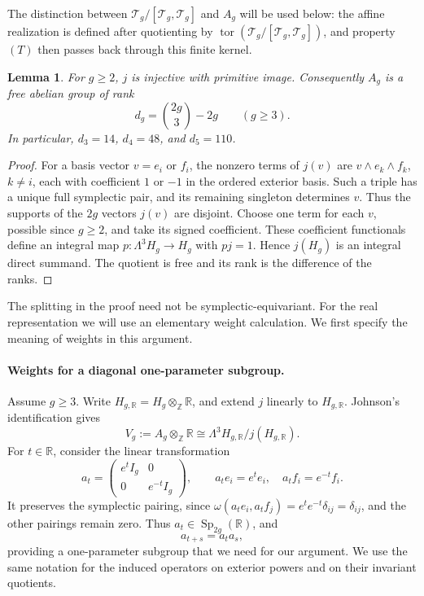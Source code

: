\documentclass[11pt,a4paper]{article}
\newtheorem{lemma}[theorem]{Lemma}
\theoremstyle{definition}
\newcommand{\R}{\mathbb R}
\newcommand{\Z}{\mathbb Z}
\newcommand{\Sp}{\operatorname{Sp}}
\newcommand{\tor}{\operatorname{tor}}
\newcommand{\rt}{(T)}
\begin{document}
The distinction between \(\mathcal{T}_g/[\mathcal{T}_g,\mathcal{T}_g]\) and \(A_g\) will be used below:
the affine realization is defined after quotienting by \(\tor(\mathcal{T}_g/[\mathcal{T}_g,\mathcal{T}_g])\),
and property~\(\rt\) then passes back through this finite kernel.

\begin{lemma}\label{lem:lattice}
For \(g\ge2\), \(j\) is injective with primitive image.
Consequently \(A_g\) is a free abelian group of rank
\[
 d_g=\binom{2g}{3}-2g \qquad(g\ge3).
\]
In particular, \(d_3=14\), \(d_4=48\), and \(d_5=110\).
\end{lemma}
\begin{proof}
For a basis vector \(v=e_i\) or \(f_i\), the nonzero terms
of \(j(v)\) are \(v\wedge e_k\wedge f_k\), \(k\ne i\),
each with coefficient \(1\) or \(-1\) in the ordered exterior
basis. Such a triple has a unique full symplectic pair, and its
remaining singleton determines \(v\). Thus the supports of the
\(2g\) vectors \(j(v)\) are disjoint. Choose one term for
each \(v\), possible since \(g\ge2\), and take its signed
coefficient. These coefficient functionals define an integral map
\(p:\Lambda^3 H_g\to H_g\) with \(pj=1\). Hence \(j(H_g)\)
is an integral direct summand. The quotient is free and its rank
is the difference of the ranks.
\end{proof}

The splitting in the proof need not be symplectic-equivariant.
For the real representation we will use an elementary weight
calculation. We first specify the
meaning of weights in this argument.

\paragraph{Weights for a diagonal one-parameter subgroup.}
Assume \(g\ge3\). Write \(H_{g,\R}=H_g\otimes_\Z\R\), and extend \(j\) linearly
to \(H_{g,\R}\). Johnson's identification gives
\[
 V_g:=A_g\otimes_\Z\R
 \cong \Lambda^3 H_{g,\R}/j(H_{g,\R}).
\]
For \(t\in\R\), consider the linear transformation
\[
 a_t=
 \begin{pmatrix}
 e^t I_g&0\\
 0&e^{-t}I_g
 \end{pmatrix},
 \qquad
 a_t e_i=e^t e_i,\quad a_t f_i=e^{-t}f_i.
\]
It preserves the symplectic pairing, since
\(\omega(a_t e_i,a_t f_j)=e^t e^{-t}\delta_{ij}=\delta_{ij}\),
and the other pairings remain zero. Thus
\(a_t\in\Sp_{2g}(\R)\), and \[a_{t+s}=a_ta_s,\] 
providing a one-parameter subgroup that we need for our argument.
We use the same notation for the induced operators on exterior
powers and on their invariant quotients.
\end{document}
